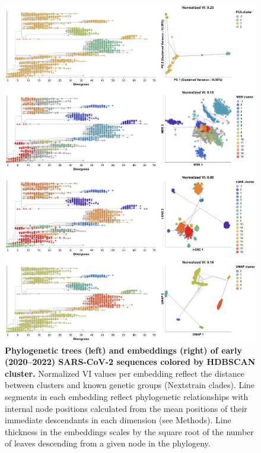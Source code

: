 \documentclass[webpdf,contemporary,large,single]{oup-authoring-template}%
\theoremstyle{thmstyleone}%
\theoremstyle{thmstyletwo}%
\theoremstyle{thmstylethree}%
\begin{document}
\begin{figure}[!h]
\includegraphics[width=0.9\columnwidth]{figures/sarscov2-embeddings-by-cluster-vs-Nextstrain_clade.png}
\caption{{\bf Phylogenetic trees (left) and embeddings (right) of early (2020--2022) SARS-CoV-2 sequences colored by HDBSCAN cluster.}
  Normalized VI values per embedding reflect the distance between clusters and known genetic groups (Nextstrain clades).
  Line segments in each embedding reflect phylogenetic relationships with internal node positions calculated from the mean positions of their immediate descendants in each dimension (see Methods).
  Line thickness in the embeddings scales by the square root of the number of leaves descending from a given node in the phylogeny.
}
\label{fig:sars-cov-2-2020-2022-clusters-vs-Nextstrain-clade}
\end{figure}
\end{document}
